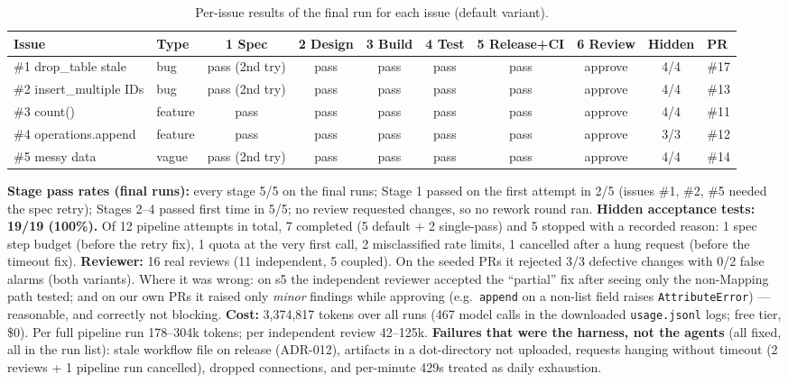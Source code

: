 \documentclass[10pt,a4paper]{article}
\newcommand{\code}[1]{\texttt{#1}}
\begin{document}
\begin{table}[H]\centering\scriptsize
\begin{tabular}{@{}l l c c c c c c c l@{}}
\toprule
Issue & Type & 1 Spec & 2 Design & 3 Build & 4 Test & 5 Release+CI & 6 Review & Hidden & PR\\
\midrule
\#1 drop\_table stale & bug & pass (2nd try) & pass & pass & pass & pass & approve & 4/4 & \#17\\
\#2 insert\_multiple IDs & bug & pass (2nd try) & pass & pass & pass & pass & approve & 4/4 & \#13\\
\#3 count() & feature & pass & pass & pass & pass & pass & approve & 4/4 & \#11\\
\#4 operations.append & feature & pass & pass & pass & pass & pass & approve & 3/3 & \#12\\
\#5 messy data & vague & pass (2nd try) & pass & pass & pass & pass & approve & 4/4 & \#14\\
\bottomrule
\end{tabular}
\caption{Per-issue results of the final run for each issue (default variant).}
\end{table}
\textbf{Stage pass rates (final runs):} every stage 5/5 on the final runs; Stage 1 passed on the first attempt in 2/5 (issues \#1, \#2, \#5 needed the spec retry); Stages 2--4 passed first time in 5/5; no review requested changes, so no rework round ran. \textbf{Hidden acceptance tests: 19/19 (100\%).} Of 12 pipeline attempts in total, 7 completed (5 default + 2 single-pass) and 5 stopped with a recorded reason: 1 spec step budget (before the retry fix), 1 quota at the very first call, 2 misclassified rate limits, 1 cancelled after a hung request (before the timeout fix).
\textbf{Reviewer:} 16 real reviews (11 independent, 5 coupled). On the seeded PRs it rejected 3/3
defective changes with 0/2 false alarms (both variants). Where it was wrong: on s5 the independent
reviewer accepted the ``partial'' fix after seeing only the non-Mapping path tested; and on our own PRs
it raised only \emph{minor} findings while approving (e.g.\ \code{append} on a non-list field raises
\code{AttributeError}) --- reasonable, and correctly not blocking.
\textbf{Cost:} 3{,}374{,}817 tokens over all runs (467 model calls in the downloaded \code{usage.jsonl} logs; free tier, \$0). Per full pipeline run
178--304k tokens; per independent review 42--125k.
\textbf{Failures that were the harness, not the agents} (all fixed, all in the run list): stale
workflow file on release (ADR-012), artifacts in a dot-directory not uploaded, requests hanging
without timeout (2 reviews + 1 pipeline run cancelled), dropped connections, and per-minute 429s
treated as daily exhaustion.
\end{document}
